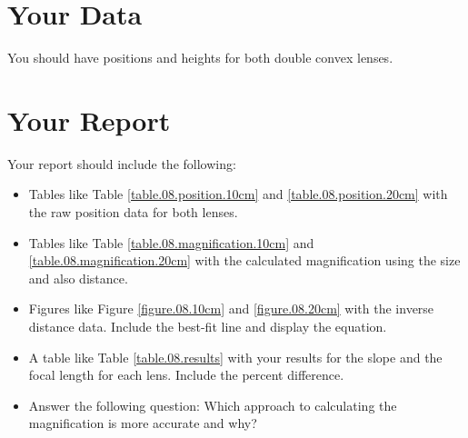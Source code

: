 \section{Your Data}
%
You should have positions and heights for both double convex lenses.
%
\newpage
\section{Your Report}
%
Your report should include the following:
\begin{itemize}
    \item Tables like Table \ref{table.08.position.10cm} and \ref{table.08.position.20cm} with the raw position data for both lenses.
    \item Tables like Table \ref{table.08.magnification.10cm} and \ref{table.08.magnification.20cm} with the calculated magnification using the size and also distance.
    \item Figures like Figure \ref{figure.08.10cm} and \ref{figure.08.20cm} with the inverse distance data. Include the best-fit line and display the equation.
    \item A table like Table \ref{table.08.results} with your results for the slope and the focal length for each lens. Include the percent difference.
    \item Answer the following question: Which approach to calculating the magnification is more accurate and why?
\end{itemize}
%
\newpage
